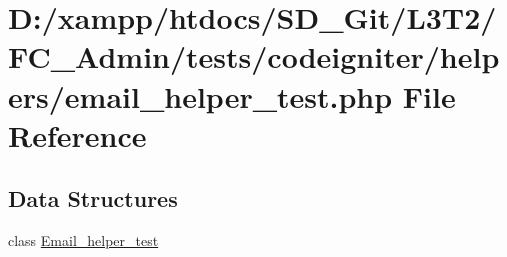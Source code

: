 \hypertarget{email__helper__test_8php}{}\section{D\+:/xampp/htdocs/\+S\+D\+\_\+\+Git/\+L3\+T2/\+F\+C\+\_\+\+Admin/tests/codeigniter/helpers/email\+\_\+helper\+\_\+test.php File Reference}
\label{email__helper__test_8php}
\subsection*{Data Structures}
\begin{DoxyCompactItemize}
\item 
class \hyperlink{class_email__helper__test}{Email\+\_\+helper\+\_\+test}
\end{DoxyCompactItemize}

